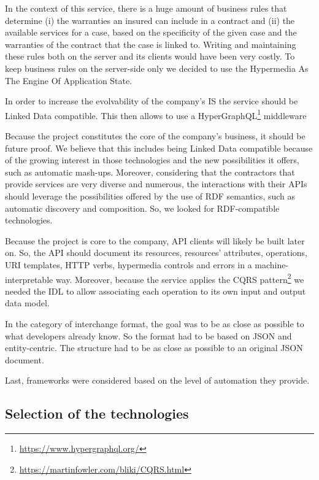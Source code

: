 In the context of this service, there is a huge amount of business rules that determine (i) the warranties an insured can include in a contract and (ii) the available services for a case, based on the specificity of the given case and the warranties of the contract that the case is linked to. Writing and maintaining these rules both on the server and its clients would have been very costly. To keep business rules on the server-side only we decided to use the Hypermedia As The Engine Of Application State.

In order to increase the evolvability of the company's IS the service should be Linked Data compatible. This then allows to use a HyperGraphQL\footnote{\url{https://www.hypergraphql.org/}} middleware 

Because the project constitutes the core of the company's business, it should be future proof. We believe that this includes being Linked Data compatible because of the growing interest in those technologies and the new possibilities it offers, such as automatic mash-ups. Moreover, considering that the contractors that provide services are very diverse and numerous, the interactions with their APIs should leverage the possibilities offered by the use of RDF semantics, such as automatic discovery and composition. So, we looked for RDF-compatible technologies.

Because the project is core to the company, API clients will likely be built later on. So, the API should document its resources, resources' attributes, operations, URI templates, HTTP verbs, hypermedia controls and errors in a machine-interpretable way. Moreover, because the service applies the CQRS pattern\footnote{\url{https://martinfowler.com/bliki/CQRS.html}} we needed the IDL to allow associating each operation to its own input and output data model.

In the category of interchange format, the goal was to be as close as possible to what developers already know. So the format had to be based on JSON and entity-centric. The structure had to be as close as possible to an original JSON document.

Last, frameworks were considered based on the level of automation they provide.

\subsection{Selection of the technologies}

